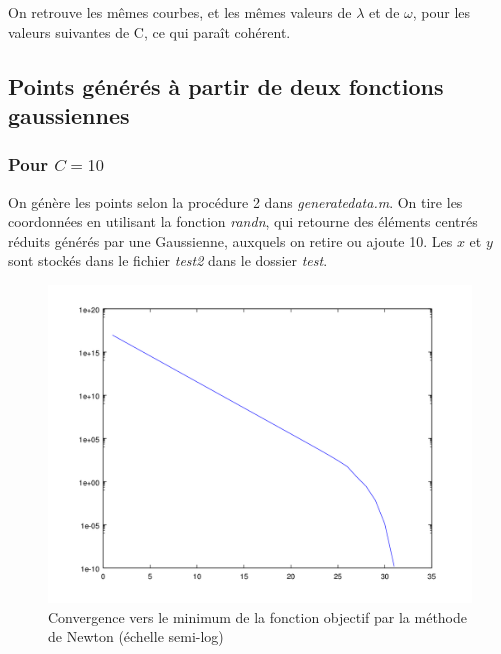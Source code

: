 \documentclass{beamer}
\begin{document}
\begin{frame}
On retrouve les mêmes courbes, et les mêmes valeurs de $\lambda$ et de $\omega$, pour les valeurs suivantes de C, ce qui paraît cohérent.

\subsection{Points générés à partir de deux fonctions gaussiennes}

\subsubsection{Pour $C = 10$}

On génère les points selon la procédure 2 dans \emph{generatedata.m}. On tire les coordonnées en utilisant la fonction \emph{randn}, qui retourne des éléments centrés réduits générés par une Gaussienne, auxquels on retire ou ajoute 10. Les $x$ et $y$ sont stockés dans le fichier \emph{test2} dans le dossier \emph{test}.

         \begin{figure}
           \begin{center}
             \subfigure\includegraphics[scale=0.3]{images/cvnewton2.png}
             \caption{Convergence vers le minimum de la fonction objectif par la méthode de Newton (échelle semi-log)}
           \end{center}
         \end{figure}


\end{frame}
\end{document}
